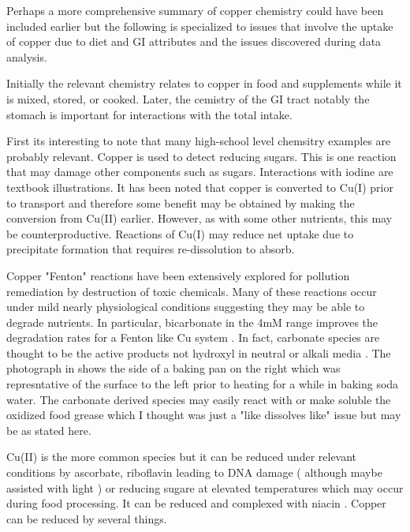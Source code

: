 

Perhaps a more comprehensive summary of copper chemistry
could have been included earlier but the following is specialized
to issues that involve the uptake of copper due to diet and
GI attributes and the issues discovered during data analysis. 

Initially the relevant chemistry relates to copper in food
and supplements while it is mixed, stored, or cooked.
Later, the cemistry of the GI tract notably the stomach
is important for interactions with the total intake. 

First its interesting to note that many high-school
level chemsitry examples are probably relevant. 
Copper is used to detect reducing sugars.
This is one reaction that may damage other components
such as sugars.
Interactions with iodine are textbook illustrations.
It has been noted that copper is converted to Cu(I) prior
to transport and therefore some benefit may be
obtained by making the conversion from Cu(II) earlier.
However, as with some other nutrients, this may
be counterproductive. 
Reactions of Cu(I) may reduce net uptake due to precipitate
formation that requires re-dissolution to absorb.


 Copper "Fenton" reactions have been extensively explored
for pollution remediation by destruction of toxic
chemicals. Many of these reactions occur under mild
nearly physiological conditions suggesting they may
be able to degrade nutrients. 
In particular, bicarbonate in the 4mM range improves
the degradation rates for a Fenton like Cu system 
\cite{Peng_Zhang_Zhang_Enhanced_mediated_2019}.
In fact, carbonate species 
are thought to be the active products not hydroxyl
in neutral or alkali media 
\cite{PMID30458276}.
The photograph in   shows the side of
a baking pan on the right which was represntative of the surface
to the left prior to heating for a while in baking soda water.
The carbonate derived species may easily react with or
make soluble the oxidized food grease which I thought was
just a "like dissolves like" issue but may be as stated here.


Cu(II) is the more common species but it can be reduced
under relevant conditions by ascorbate, riboflavin leading to
DNA damage \cite{PMID8349205}( although maybe assisted with
light \cite{PMID8791088} )  or reducing sugare
at elevated temperatures which may occur during food processing.
It can be reduced and complexed with niacin
\cite{charvv324ska_charvv322y_Interaction_niacin_with_2013}.
Copper can be reduced by several things.


